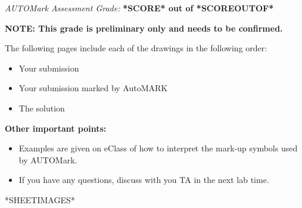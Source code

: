 \documentclass{article}
\begin{document}
\begin{center}
 \large \emph {{AUTOMark Assessment Grade:}}
 \large \textbf{*SCORE* out of *SCOREOUTOF*}\\[0.5 cm] %
\end{center}
\vspace{1.0\baselineskip} %
\begin{flushleft}
\textbf{NOTE: This grade is preliminary only and needs to be confirmed.}\\[1.0 cm] %
\end{flushleft}
The following pages include each of the drawings in the following order:
\begin{itemize}
\itemsep0em %
	\item Your submission 
	\item Your submission marked by AutoMARK
	\item The solution
\end{itemize}
%
\textbf{Other important points:}

\begin{itemize}
\itemsep0em %
	\item Examples are given on eClass of how to interpret the mark-up symbols used by AUTOMark.
	\item If you have any questions, discuss with you TA in the next lab time.
\end{itemize}


*SHEETIMAGES*
\end{document}
